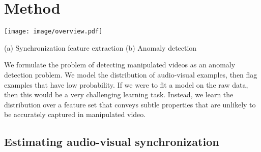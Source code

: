 \documentclass[10pt,twocolumn,letterpaper]{article}
\def\upvspacefig{\vspace{-0.0mm}}
\begin{document}
 
 
\section{Method}
\begin{figure*}[t!]
    \centering
    \upvspacefig
    \texttt{[image: image/overview.pdf]}
    \begin{flushleft}
        \vspace{-3mm}
        \hspace{6mm} (a) Synchronization feature extraction \hspace{45mm} (b) Anomaly detection
         \vspace{-3mm}
    \end{flushleft}    
    \caption{\textbf{Audio-visual anomaly detection model.}
    (a) We extract a feature set from an audio-visual synchronization network: the number of frames of delay between video frames and sound, the distribution over delays at each frame, and feature activations from the audio and visual subnetworks. (b) We train an autoregressive Transformer model to assign probabilities to synchronization features. At test time, we flag low probability examples.}
    \label{model_overview}
\end{figure*} \label{sec:method}



We formulate the problem of detecting manipulated videos as an anomaly detection problem. We model the distribution of audio-visual examples, then flag examples that have low probability. If we were to fit a model on the raw data, then this would be a very challenging learning task. Instead, we learn the distribution over a feature set that conveys subtle properties that are unlikely to be accurately captured in manipulated video. 





\subsection{Estimating audio-visual synchronization}\label{sync_estimate}
\end{document}

